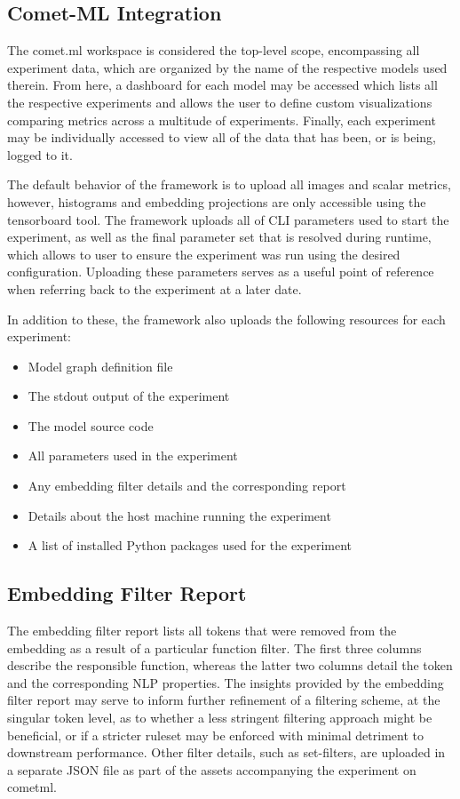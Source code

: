 \documentclass[../../fyp.tex]{subfiles}
\begin{document}
\subsection{Comet-ML Integration}
The comet.ml workspace is considered the top-level scope, encompassing all experiment data, which are organized by the name of the respective models used therein. From here, a dashboard for each model may be accessed which lists all the respective experiments and allows the user to define custom visualizations comparing metrics across a multitude of experiments. Finally, each experiment may be individually accessed to view all of the data that has been, or is being, logged to it.

The default behavior of the framework is to upload all images and scalar metrics, however, histograms and embedding projections are only accessible using the tensorboard tool. The framework uploads all of CLI parameters used to start the experiment, as well as the final parameter set that is resolved during runtime, which allows to user to ensure the experiment was run using the desired configuration. Uploading these parameters serves as a useful point of reference when referring back to the experiment at a later date. 

In addition to these, the framework also uploads the following resources for each experiment:
\begin{itemize}
\item Model graph definition file
\item The stdout output of the experiment
\item The model source code
\item All parameters used in the experiment
\item Any embedding filter details and the corresponding report
\item Details about the host machine running the experiment
\item A list of installed Python packages used for the experiment
\end{itemize}

\subsection{Embedding Filter Report}
The embedding filter report lists all tokens that were removed from the embedding as a result of a particular function filter. The first three columns describe the responsible function, whereas the latter two columns detail the token and the corresponding NLP properties. The insights provided by the embedding filter report may serve to inform further refinement of a filtering scheme, at the singular token level, as to whether a less stringent filtering approach might be beneficial, or if a stricter ruleset may be enforced with minimal detriment to downstream performance. Other filter details, such as set-filters, are uploaded in a separate JSON file as part of the assets accompanying the experiment on cometml.
\end{document}
